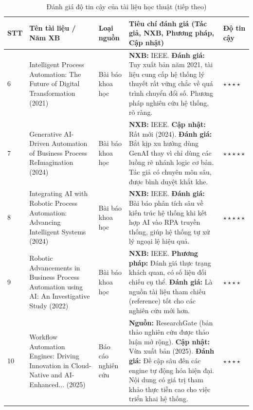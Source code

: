 \documentclass[12pt,a4paper]{article}
\begin{document}
\newpage
\begin{table}[H]
    \centering
    \caption{Đánh giá độ tin cậy của tài liệu học thuật (tiếp theo)}
    \vspace{0.2cm}
    \small
    \begin{tabular}{|p{0.5cm}|p{3.8cm}|p{2.0cm}|p{8.2cm}|p{1.5cm}|}
        \hline
        \textbf{STT} & \textbf{Tên tài liệu / Năm XB} & \textbf{Loại nguồn} & \textbf{Tiêu chí đánh giá (Tác giả, NXB, Phương pháp, Cập nhật)} & \textbf{Độ tin cậy} \\
        \hline
        6 & Intelligent Process Automation: The Future of Digital Transformation (2021) & Bài báo khoa học & \textbf{NXB:} IEEE. \newline \textbf{Đánh giá:} Tuy xuất bản năm 2021, tài liệu cung cấp hệ thống lý thuyết rất vững chắc về quá trình chuyển đổi số. Phương pháp nghiên cứu hệ thống, rõ ràng. & $\star\star\star\star$ \\
        \hline
        7 & Generative AI-Driven Automation of Business Process ReImagination (2024) & Bài báo khoa học & \textbf{NXB:} IEEE. \newline \textbf{Cập nhật:} Rất mới (2024). \newline \textbf{Đánh giá:} Bắt kịp xu hướng dùng GenAI thay vì chỉ dùng các luồng rẽ nhánh logic cơ bản. Tác giả có chuyên môn sâu, được bình duyệt khắt khe. & $\star\star\star\star\star$ \\
        \hline
        8 & Integrating AI with Robotic Process Automation: Advancing Intelligent Systems (2024) & Bài báo khoa học & \textbf{NXB:} IEEE. \newline \textbf{Đánh giá:} Bài báo phân tích sâu về kiến trúc hệ thống khi kết hợp AI vào RPA truyền thống, giúp hệ thống tự xử lý ngoại lệ hiệu quả. & $\star\star\star\star\star$ \\
        \hline
        9 & Robotic Advancements in Business Process Automation using AI: An Investigative Study (2022) & Bài báo khoa học & \textbf{NXB:} IEEE. \newline \textbf{Phương pháp:} Đánh giá thực trạng khách quan, có số liệu đối chiếu cụ thể. \newline \textbf{Đánh giá:} Là nguồn tài liệu tham chiếu (reference) tốt cho các nghiên cứu mới hơn. & $\star\star\star\star$ \\
        \hline
        10 & Workflow Automation Engines: Driving Innovation in Cloud-Native and AI-Enhanced... (2025) & Báo cáo nghiên cứu & \textbf{Nguồn:} ResearchGate (bản thảo nghiên cứu được thảo luận mở rộng). \newline \textbf{Cập nhật:} Vừa xuất bản (2025). \newline \textbf{Đánh giá:} Đề cập sâu đến các engine tự động hóa hiện đại. Nội dung có giá trị tham khảo thực tiễn cao cho việc triển khai hệ thống. & $\star\star\star\star$ \\
        \hline
    \end{tabular}
    \label{tab:evaluation_part2}
\end{table}
\end{document}

